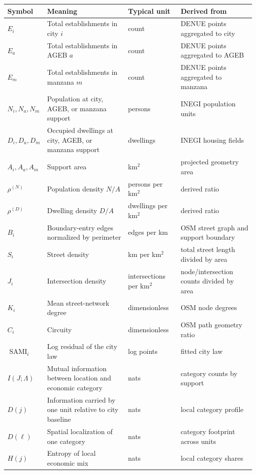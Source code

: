 \documentclass[11pt]{article}
\newcommand{\SAMI}{\operatorname{SAMI}}
\begin{document}
\begin{longtable}{p{}p{}p{}p{}}
\toprule
\textbf{Symbol} & \textbf{Meaning} & \textbf{Typical unit} & \textbf{Derived from} \\
\midrule
\endhead
\(E_i\) & Total establishments in city \(i\) & count & DENUE points aggregated to city \\
\(E_a\) & Total establishments in AGEB \(a\) & count & DENUE points aggregated to AGEB \\
\(E_m\) & Total establishments in manzana \(m\) & count & DENUE points aggregated to manzana \\
\(N_i,N_a,N_m\) & Population at city, AGEB, or manzana support & persons & INEGI population units \\
\(D_i,D_a,D_m\) & Occupied dwellings at city, AGEB, or manzana support & dwellings & INEGI housing fields \\
\(A_i,A_a,A_m\) & Support area & km\(^2\) & projected geometry area \\
\(\rho^{(N)}\) & Population density \(N/A\) & persons per km\(^2\) & derived ratio \\
\(\rho^{(D)}\) & Dwelling density \(D/A\) & dwellings per km\(^2\) & derived ratio \\
\(B_i\) & Boundary-entry edges normalized by perimeter & edges per km & OSM street graph and support boundary \\
\(S_i\) & Street density & km per km\(^2\) & total street length divided by area \\
\(J_i\) & Intersection density & intersections per km\(^2\) & node/intersection counts divided by area \\
\(K_i\) & Mean street-network degree & dimensionless & OSM node degrees \\
\(C_i\) & Circuity & dimensionless & OSM path geometry ratio \\
\(\SAMI_i\) & Log residual of the city law & log points & fitted city law \\
\(I(J;\Lambda)\) & Mutual information between location and economic category & nats & category counts by support \\
\(D(j)\) & Information carried by one unit relative to city baseline & nats & local category profile \\
\(D(\ell)\) & Spatial localization of one category & nats & category footprint across units \\
\(H(j)\) & Entropy of local economic mix & nats & local category shares \\
\bottomrule
\end{longtable}
\end{document}
